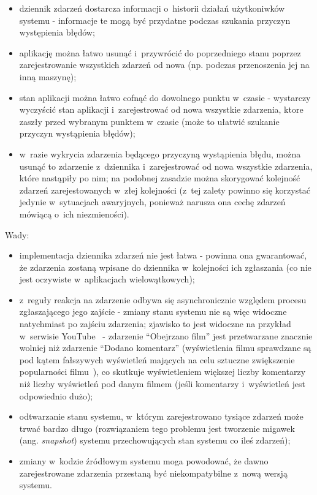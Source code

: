 \begin{itemize}
 \item dziennik zdarzeń dostarcza informacji o~historii działań użytkoniwków systemu - informacje te mogą być przydatne podczas szukania przyczyn występienia błędów;
 \item aplikację można łatwo usunąć i~przywrócić do poprzedniego stanu poprzez zarejestrowanie wszystkich zdarzeń od nowa (np. podczas przenoszenia jej na inną maszynę);
 \item stan aplikacji można łatwo cofnąć do dowolnego punktu w~czasie - wystarczy wyczyścić stan aplikacji i~zarejestrować od nowa wszystkie zdarzenia, ktore zaszły przed wybranym punktem w~czasie (może to ułatwić szukanie przyczyn wystąpienia błędów);
 \item w~razie wykrycia zdarzenia będącego przyczyną wystąpienia błędu, można usunąć to zdarzenie z~dziennika i~zarejestrować od nowa wszystkie zdarzenia, które nastąpiły po nim; na podobnej zasadzie można skorygować kolejność zdarzeń zarejestowanych w~złej kolejności (z~tej zalety powinno się korzystać jedynie w~sytuacjach awaryjnych, ponieważ narusza ona cechę zdarzeń mówiącą o~ich niezmieności).
\end{itemize}

Wady:

\begin{itemize}
 \item implementacja dziennika zdarzeń nie jest łatwa - powinna ona gwarantować, że zdarzenia zostaną wpisane do dziennika w~kolejności ich zgłaszania (co nie jest oczywiste w~aplikacjach wielowątkowych);
 \item z~reguły reakcja na zdarzenie odbywa się asynchronicznie względem procesu zgłaszającego jego zajście - zmiany stanu systemu nie są więc widoczne natychmiast po zajściu zdarzenia; zjawisko to jest widoczne na przykład w~serwisie YouTube~\cite{youtube} - zdarzenie ``Obejrzano film'' jest przetwarzane znacznie wolniej niż zdarzenie ``Dodano komentarz'' (wyświetlenia filmu sprawdzane są pod kątem fałszywych wyświetleń mających na celu sztuczne zwiększenie popularności filmu~\cite{youtube:301}), co skutkuje wyświetleniem większej liczby komentarzy niż liczby wyświetleń pod danym filmem (jeśli komentarzy i~wyświetleń jest odpowiednio dużo);
 \item odtwarzanie stanu systemu, w~którym zarejestrowano tysiące zdarzeń może trwać bardzo długo (rozwiązaniem tego problemu jest tworzenie migawek (ang. \emph{snapshot}) systemu przechowujących stan systemu co ileś zdarzeń);
 \item zmiany w~kodzie źródłowym systemu moga powodować, że dawno zarejestrowane zdarzenia przestaną być niekompatybilne z~nową wersją systemu.
\end{itemize}


